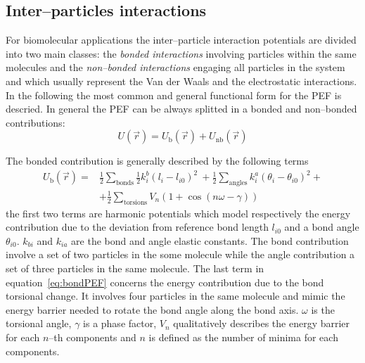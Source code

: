 \subsection{Inter--particles interactions}
For biomolecular applications the inter--particle interaction potentials are divided into two main classes: the 
\textit{bonded interactions} involving particles within the same molecules and the \textit{non--bonded 
interactions} engaging all particles in the system and which usually represent the Van der Waals and the 
electrostatic interactions. In the following the most common and general functional form for the \ac{PEF} is 
descried. In general the \ac{PEF} can be always splitted in a bonded and non--bonded contributions:
\begin{equation*}
	U(\vec r) = U_{\text{b}}(\vec r) + U_\text{nb}(\vec r)
	\label{eq:FFPEF}
\end{equation*}

The bonded contribution is generally described by the following terms
\begin{equation}
	\begin{aligned}
	U_{\text{b}}(\vec r) = &\frac{1}{2}\sum_{\text{bonds}} \frac{1}{2}k_i^b(l_i - l_{i0})^2\ + \frac{1}{2}\sum_{\text{angles}} k_i^a (\theta_i - \theta_{i0})^2 +\\
		 	& +\frac{1}{2}\sum_{\text{torsions}} V_n(1+\cos (n\omega - \gamma))
	\end{aligned}
	\label{eq:bondPEF}
\end{equation} 
the first two terms are harmonic potentials which model respectively the energy contribution due to the deviation 
from reference bond length $l_{i0}$ and a bond angle $\theta_{i0}$. $k_{bi}$ and $k_{ia}$ are the bond and angle 
elastic constants. The bond contribution involve a set of two particles in the some molecule while the angle 
contribution a set of three particles in the same molecule. The last term in equation~\eqref{eq:bondPEF} concerns 
the energy contribution due to the bond torsional change. It involves four particles in the same molecule and 
mimic the energy barrier needed to rotate the bond angle along the bond axis. $\omega$ is the torsional angle, 
$\gamma$ is a phase factor, $V_n$ qualitatively describes the energy barrier for each $n$--th components and $n$ 
is defined as the number of minima for each components.


